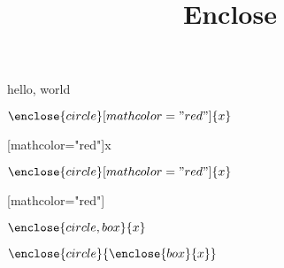 \documentclass{amsart}
\title{Enclose}
\begin{document}
hello, world

$\enclose{circle}[mathcolor="red"]{x}$

[mathcolor="red"]{x}

$\enclose{circle}[mathcolor="red"]{\color{black}{x}}$

[mathcolor="red"]{\color{black}{x}}

$\enclose{circle,box}{x}$


$\enclose{circle}{\enclose{box}{x}}$

\end{document}
